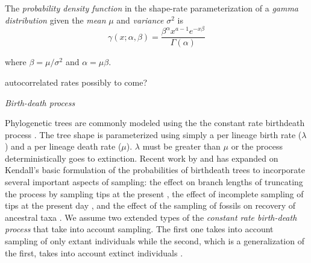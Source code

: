 \documentclass{llncs}
\newcommand{\ejmcomment}[1]{{\color{green} #1}}
\renewcommand{\subsection}[1]{%
\bigskip
\begin{center}
\begin{large}
\normalfont\itshape #1
\end{large}
\end{center}}
\begin{document}
The {\em probability density function} in the shape-rate parameterization of a
{\em gamma distribution} given the {\em mean} $\mu$ and {\em variance} $\sigma^2$ 
is
$$ \gamma(x;\alpha,\beta) = \frac{\beta^{\alpha}x^{a-1}e^{-x\beta}}{\Gamma(\alpha)} $$

where $\beta = \mu / \sigma^2$ and $\alpha = \mu \beta$.

\ejmcomment{autocorrelated rates possibly to come?}

\subsection{Birth-death process}
Phylogenetic trees are commonly modeled using the the constant rate birth\textendash death process \citep{Kendall1948}.
The tree shape is parameterized using simply a per lineage birth rate ($\lambda$) and a per lineage death rate ($\mu$).
$\lambda$ must be greater than $\mu$ or the process deterministically goes to extinction.
Recent work by \citet{Gernhard2008} and \citet{Stadler2009, Stadler2010} has expanded on Kendall's basic 
formulation of the probabilities of birth\textendash death trees to incorporate several important aspects of sampling:
the effect on branch lengths of truncating the process by sampling tips at the present \citep{Gernhard2008},
the effect of incomplete sampling of tips at the present day \citep{Stadler2009}, and the effect of the sampling
of fossils on recovery of ancestral taxa \citep{Stadler2010}.
We assume two extended types of the {\em constant rate birth-death process}
that take into account sampling. The
first one takes into account sampling of only extant individuals
\citep{Stadler2009} while the second, which is a generalization of the first,
takes into account extinct individuals \citep{Stadler2010}.
\end{document}
